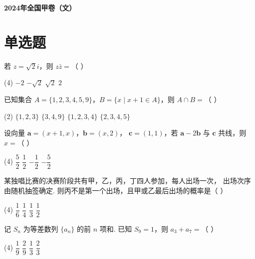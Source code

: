 \documentclass[UTF8,12pt]{ctexart}
\newcommand{\examtitle}{2024年全国甲卷（文）}
\newcommand{\makeexamtitle}{%
  \begin{center}
    {\LARGE\bfseries\examtitle}\par
  \end{center}\vspace{0.4em}}
\begin{document}
\makeexamtitle

\section*{单选题}

\begin{questions}

  \item 若 $z=\sqrt2i$，则 $z\bar z=$（ ）

    \begin{tasks}(4)
      \task $-2$
      \task $-\sqrt2$
      \task $\sqrt2$
      \task $2$
    \end{tasks}

  \item 已知集合 $A=\{1,2,3,4,5,9\}$，$B=\{x\mid x+1\in A\}$，则 $A\cap B=$（ ）

    \begin{tasks}(2)
      \task $\{1,2,3\}$
      \task $\{3,4,9\}$
      \task $\{1,2,3,4\}$
      \task $\{2,3,4,5\}$
    \end{tasks}

  \item 设向量 $\boldsymbol{a}=(x+1,x)$，$\boldsymbol{b}=(x,2)$，%
    $\boldsymbol{c}=(1,1)$，若 $\boldsymbol{a}-2\boldsymbol{b}$ 与 $\boldsymbol{c}$
    共线，则 $x=$（ ）

    \begin{tasks}(4)
      \task $\dfrac52$
      \task $\dfrac12$
      \task $-\dfrac12$
      \task $-\dfrac52$
    \end{tasks}

  \item 某独唱比赛的决赛阶段共有甲，乙，丙，丁四人参加，每人出场一次，
    出场次序由随机抽签确定. 则丙不是第一个出场，且甲或乙最后出场的概率是（ ）

    \begin{tasks}(4)
      \task $\dfrac16$
      \task $\dfrac14$
      \task $\dfrac13$
      \task $\dfrac12$
    \end{tasks}

  \item 记 $S_n$ 为等差数列 $\{a_n\}$ 的前 $n$ 项和. 已知 $S_9=1$，则 $a_3+a_7=$（ ）

    \begin{tasks}(4)
      \task $\dfrac19$
      \task $\dfrac29$
      \task $\dfrac13$
      \task $\dfrac23$
    \end{tasks}


\end{questions}
\end{document}
